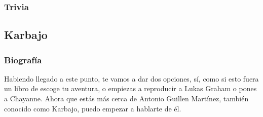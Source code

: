 \documentclass[letterpaper]{article}
\begin{document}
\subsubsection{Trivia}


\subsection{Karbajo}

\subsubsection{Biografía}

Habiendo llegado a este punto, te vamos a dar dos opciones, sí, como si esto fuera un libro de escoge tu aventura, o empiezas a reproducir a Lukas Graham o pones a
Chayanne. Ahora que estás más cerca de Antonio Guillen Martínez, también conocido como Karbajo, puedo empezar a hablarte de él.\\
\end{document}
